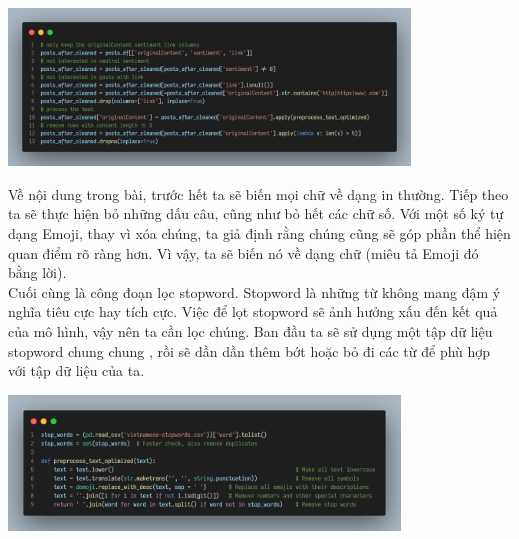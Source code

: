 \begin{center}
\includegraphics[width=0.8\textwidth]{images/code-5.6.png}
\end{center}

Về nội dung trong bài, trước hết ta sẽ biến mọi chữ về dạng in thường. Tiếp theo ta sẽ thực hiện bỏ những dấu câu, cũng như bỏ hết các chữ số. Với một số ký tự dạng Emoji, thay vì xóa chúng, ta giả định rằng chúng cũng sẽ góp phần thể hiện quan điểm rõ ràng hơn. Vì vậy, ta sẽ biến nó về dạng chữ (miêu tả Emoji đó bằng lời).\\

Cuối cùng là công đoạn lọc stopword. Stopword là những từ không mang đậm ý nghĩa tiêu cực hay tích cực. Việc để lọt stopword sẽ ảnh hưởng xấu đến kết quả của mô hình, vậy nên ta cần lọc chúng. Ban đầu ta sẽ sử dụng một tập dữ liệu stopword chung chung \cite{vnstopwords}, rồi sẽ dần dần thêm bớt hoặc bỏ đi các từ để phù hợp với tập dữ liệu của ta.
\begin{center}
\includegraphics[width=0.78\textwidth]{images/code-5.7.png}
\end{center}

